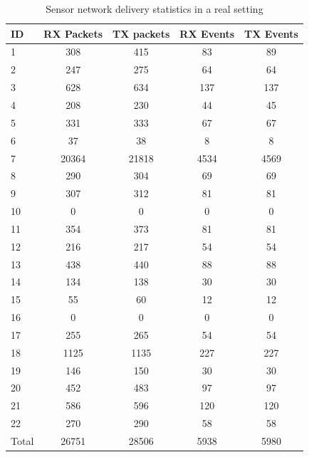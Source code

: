 \begin{table}
  \centering
  \begin{tabular}{lcccc}
  \hline
  ID & RX Packets & TX packets & RX Events & TX Events \\
  \hline
﻿1&      308     &    415    &      83     &     89\\
  2&       247    &     275   &       64    &      64\\
  3&       628    &     634   &      137    &     137\\
  4&       208    &     230   &       44    &      45\\
  5&       331    &     333   &       67    &      67\\
  6&        37    &      38   &        8    &       8\\
  7&     20364    &   21818   &     4534    &    4569\\
  8&       290    &     304   &       69    &      69\\
  9&       307    &     312   &       81    &      81\\
  10&         0   &        0  &         0   &        0\\
  11&       354   &      373   &       81    &      81\\
  12&       216   &      217  &        54    &      54\\
  13&       438   &      440  &        88    &      88\\
  14&       134   &      138  &        30    &      30\\
  15&        55   &       60  &        12    &      12\\
  16&         0   &        0  &         0    &       0\\
  17&       255   &      265  &        54    &      54\\
  18&      1125   &    1135   &      227     &    227\\
  19&       146   &      150  &        30    &      30\\
  20&       452   &     483   &       97     &     97\\
  21&       586   &     596   &      120     &    120\\
  22&       270   &      290  &        58    &      58 \\ 
  \hline
  Total&    ﻿26751   &    28506   &     5938    &    5980 \\ 
  \end{tabular}
  \caption{Sensor network delivery statistics in a real setting}
  \label{tab:recvstat}
\end{table}
